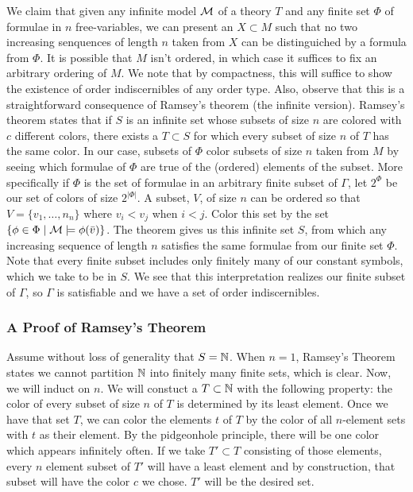 We claim that given any infinite model \(\mathcal{M}\) of a theory \(T\) and any finite set \(\Phi\) of formulae in \(n\) free-variables, we can present an \(X \subset M\) such that no two increasing senquences of length \(n\) taken from \(X\) can be distinguiched by a formula from \(\Phi\). 
It is possible that \(M\) isn't ordered, in which case it suffices to fix an arbitrary ordering of \(M\). 
We note that by compactness, this will suffice to show the existence of order indiscernibles of any order type. 
Also, observe that this is a straightforward consequence of Ramsey's theorem (the infinite version).
Ramsey's theorem states that if \(S\) is an infinite set whose subsets of size \(n\) are colored with \(c\) different colors, there exists a \(T \subset S\) for which every subset of size \(n\) of \(T\) has the same color. 
In our case, subsets of \(\Phi\) color subsets of size \(n\) taken from \(M\) by seeing which formulae of \(\Phi\) are true of the (ordered) elements of the subset. %
More specifically if \(\Phi\) is the set of formulae in an arbitrary finite subset of \(\Gamma\), let \(2^\Phi\) be our set of colors of size \(2^{|\Phi|}\). 
A subset, \(V\), of size \(n\) can be ordered so that \(V = \{v_1, \ldots, n_n\}\) where \(v_i < v_j\) when \(i < j\). 
Color this set by the set \(\{\phi \in \Phi \mid \mathcal{M} \models \phi(\bar{v})\}\). 
The theorem gives us this infinite set \(S\), from which any increasing sequence of length \(n\) satisfies the same formulae from our finite set \(\Phi\).
Note that every finite subset includes only finitely many of our constant symbols, which we take to be in \(S\). 
We see that this interpretation realizes our finite subset of \(\Gamma\), so \(\Gamma\) is satisfiable and we have a set of order indiscernibles. 

\subsubsection{A Proof of Ramsey's Theorem}
Assume without loss of generality that \(S = \mathbb{N}\).
When \(n=1\), Ramsey's Theorem states we cannot partition \(\mathbb{N}\) into finitely many finite sets, which is clear.
Now, we will induct on \(n\). 
We will constuct a \(T \subset \mathbb{N}\) with the following property: the color of every subset of size \(n\) of \(T\) is determined by its least element. 
Once we have that set \(T\), we can color the elements \(t\) of \(T\) by the color of all \(n\)-element sets with \(t\) as their element. 
By the pidgeonhole principle, there will be one color which appears infinitely often. 
If we take \(T' \subset T\) consisting of those elements, every \(n\) element subset of \(T'\) will have a least element and by construction, that subset will have the color \(c\) we chose. 
\(T'\) will be the desired set. 

